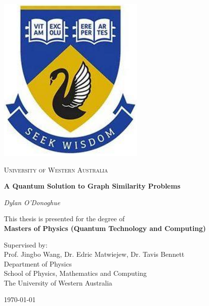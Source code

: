 \begin{titlepage}


\thispagestyle{empty}
\setlength\headheight{0pt} 
\begin{center}

\begin{center}
\includegraphics[width=0.4\linewidth]{Figs/uwa.PNG}            
\end{center}	

        \vspace{0.25cm}
        {\scshape\LARGE University of Western Australia \par}
        \vspace{0.5cm}

        {\LARGE\bfseries A Quantum Solution to Graph Similarity Problems\par}
        
        \vspace{0.5cm}
        {\Large\itshape Dylan O'Donoghue\par}
        \vspace{0.25cm}
        {This thesis is presented for the degree of\\
        \bfseries Masters of Physics (Quantum Technology and Computing)\par}

\vspace{0.75cm}
Supervised by:\\
Prof. Jingbo Wang, Dr. Edric Matwiejew, Dr. Tavis Bennett \\
Department of Physics\\
School of Physics, Mathematics and Computing\\
The University of Western Australia\par
\vspace{0.75cm}
\large
\today

\end{center}

\clearpage
\restoregeometry
\end{titlepage}
